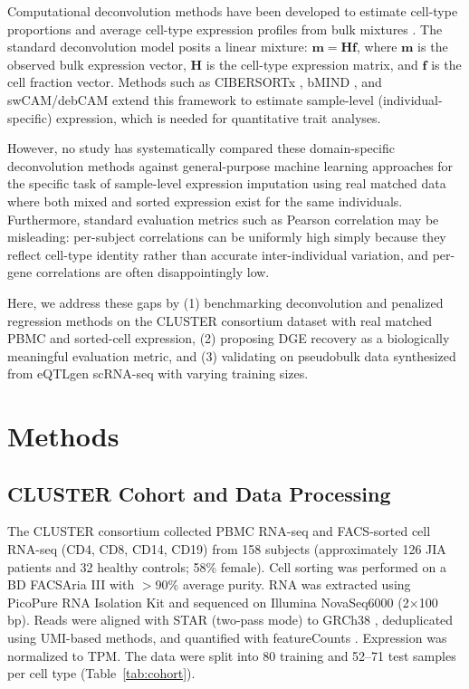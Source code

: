 \documentclass[12pt]{article}
\begin{document}
Computational deconvolution methods have been developed to estimate cell-type proportions and average cell-type expression profiles from bulk mixtures \citep{newman2015robust, newman2019cibersortx}. The standard deconvolution model posits a linear mixture: $\mathbf{m} = \mathbf{H}\mathbf{f}$, where $\mathbf{m}$ is the observed bulk expression vector, $\mathbf{H}$ is the cell-type expression matrix, and $\mathbf{f}$ is the cell fraction vector. Methods such as CIBERSORTx \citep{newman2019cibersortx}, bMIND \citep{wang2021bmind}, and swCAM/debCAM \citep{chen2019debcam, chen2022swcam} extend this framework to estimate sample-level (individual-specific) expression, which is needed for quantitative trait analyses.

However, no study has systematically compared these domain-specific deconvolution methods against general-purpose machine learning approaches for the specific task of sample-level expression imputation using real matched data where both mixed and sorted expression exist for the same individuals. Furthermore, standard evaluation metrics such as Pearson correlation may be misleading: per-subject correlations can be uniformly high simply because they reflect cell-type identity rather than accurate inter-individual variation, and per-gene correlations are often disappointingly low.

Here, we address these gaps by (1) benchmarking deconvolution and penalized regression methods on the CLUSTER consortium dataset with real matched PBMC and sorted-cell expression, (2) proposing DGE recovery as a biologically meaningful evaluation metric, and (3) validating on pseudobulk data synthesized from eQTLgen scRNA-seq with varying training sizes.

\section{Methods}

\subsection{CLUSTER Cohort and Data Processing}

The CLUSTER consortium collected PBMC RNA-seq and FACS-sorted cell RNA-seq (CD4, CD8, CD14, CD19) from 158 subjects (approximately 126 JIA patients and 32 healthy controls; 58\% female). Cell sorting was performed on a BD FACSAria III with $>$90\% average purity. RNA was extracted using PicoPure RNA Isolation Kit and sequenced on Illumina NovaSeq6000 (2$\times$100 bp). Reads were aligned with STAR (two-pass mode) to GRCh38 \citep{dobin2013star}, deduplicated using UMI-based methods, and quantified with featureCounts \citep{liao2014featurecounts}. Expression was normalized to TPM. The data were split into 80 training and 52--71 test samples per cell type (Table~\ref{tab:cohort}).
\end{document}
